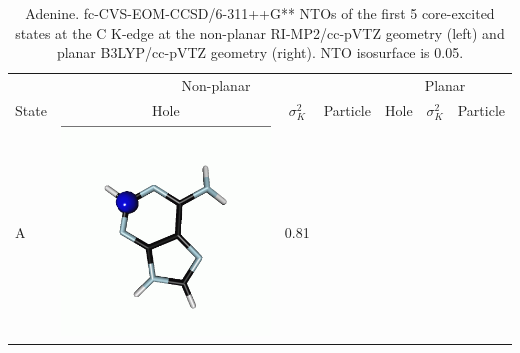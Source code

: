 \documentclass[journal=jctcce,manuscript=article]{achemso}
\begin{document}
\begin{table}[H]
\centering
\caption{Adenine. fc-CVS-EOM-CCSD/6-311++G** NTOs of the first 5 core-excited states at the C K-edge at the non-planar RI-MP2/cc-pVTZ geometry (left) and planar B3LYP/cc-pVTZ geometry (right). NTO isosurface is 0.05.\label{adenine-ntos-Cedge}}
\vspace{3em}
\small
\begin{tabular}{ l| c c c | c c c }
\hline
& \multicolumn{3}{c}{Non-planar} & \multicolumn{3}{|c}{Planar} \\
    State &  Hole &$\sigma_K^2$& Particle & Hole &$\sigma_K^2$& Particle \\
    \hline
    A &  
    \begin{minipage}{0.2\textwidth}
        \centering
        \includegraphics[scale=0.10]{NTO/Adenine_C/1h_C1.png}
    \end{minipage}
    & 0.81
    &  \begin{minipage}{0.2\textwidth}
        \centering

\end{minipage}
\end{tabular}
\end{table}
\end{document}
